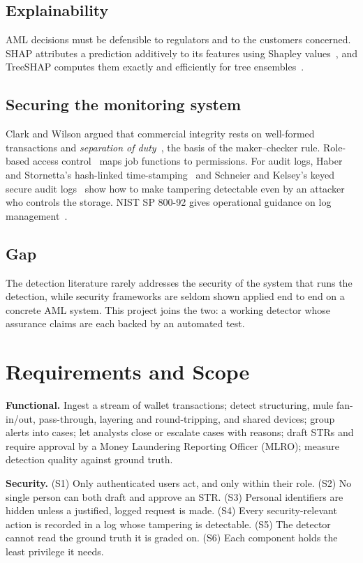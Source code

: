 \documentclass[conference,10pt]{IEEEtran}
\begin{document}
\subsection{Explainability}
AML decisions must be defensible to regulators and to the customers concerned. SHAP attributes a
prediction additively to its features using Shapley values~\cite{lundberg2017shap}, and TreeSHAP
computes them exactly and efficiently for tree ensembles~\cite{lundberg2020tree}.

\subsection{Securing the monitoring system}
Clark and Wilson argued that commercial integrity rests on well-formed transactions and
\emph{separation of duty}~\cite{clarkwilson1987}, the basis of the maker--checker rule.
Role-based access control~\cite{sandhu1996rbac} maps job functions to permissions. For audit logs,
Haber and Stornetta's hash-linked time-stamping~\cite{haber1991timestamp} and Schneier and Kelsey's
keyed secure audit logs~\cite{schneier1999audit} show how to make tampering detectable even by an
attacker who controls the storage. NIST SP 800-92 gives operational guidance on log
management~\cite{nist80092}.

\subsection{Gap}
The detection literature rarely addresses the security of the system that runs the detection,
while security frameworks are seldom shown applied end to end on a concrete AML system. This project
joins the two: a working detector whose assurance claims are each backed by an automated test.

\section{Requirements and Scope}

\textbf{Functional.} Ingest a stream of wallet transactions; detect structuring, mule fan-in/out,
pass-through, layering and round-tripping, and shared devices; group alerts into cases; let analysts
close or escalate cases with reasons; draft STRs and require approval by a Money Laundering
Reporting Officer (MLRO); measure detection quality against ground truth.

\textbf{Security.} (S1) Only authenticated users act, and only within their role. (S2) No single
person can both draft and approve an STR. (S3) Personal identifiers are hidden unless a justified,
logged request is made. (S4) Every security-relevant action is recorded in a log whose tampering is
detectable. (S5) The detector cannot read the ground truth it is graded on. (S6) Each component
holds the least privilege it needs.
\end{document}
